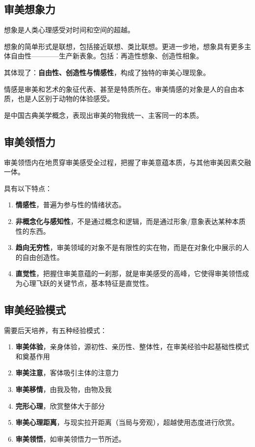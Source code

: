 \documentclass{NoteThesis/note-thesis}
\begin{document}
\subsection{审美想象力}

想象是人类心理感受对时间和空间的超越。

想象的简单形式是联想，包括接近联想、类比联想。更进一步地，想象具有更多主体自由性————生产新表象。包括：再造性想象、创造性相象。

其体现了：\textbf{自由性、创造性与情感性}，构成了独特的审美心理现象。

\begin{mynote_env}[frametitle={审美情感}]
    情感是审美和艺术的象征代表、甚至是特质所在。审美情感的对象是人的自由本质，也是人区别于动物的体验感受。
\end{mynote_env}

\begin{mynote_env}[frametitle={情景交融}]
    是中国古典美学概念，表现出审美的物我统一、主客同一的本质。
\end{mynote_env}

\subsection{审美领悟力}

审美领悟内在地贯穿审美感受全过程，把握了审美意蕴本质，与其他审美因素交融一体。

具有以下特点：

\begin{enumerate}
    \item \textbf{情感性}，普遍为参与性的情绪状态。
    \item \textbf{非概念化与感知性}，不是通过概念和逻辑，而是通过形象/意象表达某种本质性的东西。
    \item \textbf{趋向无穷性}，审美领域的对象不是有限性的实在物，而是在对象化中展示的人的自由创造性。
    \item \textbf{直觉性}，把握住审美意蕴的一刹那，就是审美感受的高峰，它使得审美领悟成为心理飞跃的关键节点，基本特征是直觉性。
\end{enumerate}

\subsection{\texorpdfstring{\mbox{}}{} 审美经验模式}

需要后天培养，有五种经验模式：

\begin{enumerate}
    \item \textbf{审美体验}，亲身体验，源初性、亲历性、整体性，在审美经验中起基础性模式和奠基作用
    \item \textbf{审美注意}，客体吸引主体的注意力
    \item \textbf{审美移情}，由我及物，由物及我
    \item \textbf{完形心理}，欣赏整体大于部分
    \item \textbf{审美心理距离}，与现实拉开距离（当局与旁观），超越使用态度进行欣赏。
    \item \textbf{审美领悟}，如审美领悟力一节所述。
\end{enumerate}
\end{document}
